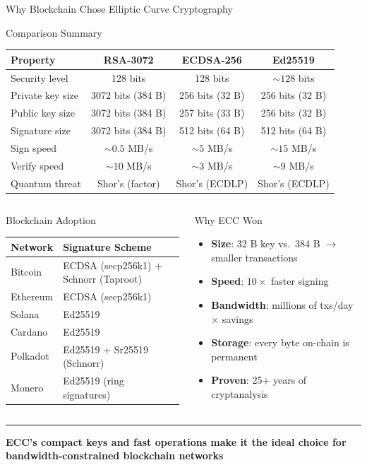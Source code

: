 \documentclass[8pt,aspectratio=169]{beamer}
\newcommand{\bottomnote}[1]{\vfill\vspace{-2mm}\textcolor{mllavender2}{\rule{\textwidth}{0.4pt}}\vspace{1mm}\footnotesize\textbf{#1}}
\begin{document}
\begin{frame}{Why Blockchain Chose Elliptic Curve Cryptography}
\begin{block}{Comparison Summary}
\small
\begin{center}
\begin{tabular}{lccc}
\toprule
\textbf{Property} & \textbf{RSA-3072} & \textbf{ECDSA-256} & \textbf{Ed25519} \\
\midrule
Security level & 128 bits & 128 bits & $\sim 128$ bits \\
Private key size & 3072 bits (384 B) & 256 bits (32 B) & 256 bits (32 B) \\
Public key size & 3072 bits (384 B) & 257 bits (33 B) & 256 bits (32 B) \\
Signature size & 3072 bits (384 B) & 512 bits (64 B) & 512 bits (64 B) \\
Sign speed & $\sim 0.5$ MB/s & $\sim 5$ MB/s & $\sim 15$ MB/s \\
Verify speed & $\sim 10$ MB/s & $\sim 3$ MB/s & $\sim 9$ MB/s \\
Quantum threat & Shor's (factor) & Shor's (ECDLP) & Shor's (ECDLP) \\
\bottomrule
\end{tabular}
\end{center}
\end{block}
\vspace{2mm}
\begin{columns}
\begin{block}{Blockchain Adoption}
\scriptsize
\begin{tabular}{ll}
\toprule
\textbf{Network} & \textbf{Signature Scheme} \\
\midrule
Bitcoin & ECDSA (secp256k1) + Schnorr (Taproot) \\
Ethereum & ECDSA (secp256k1) \\
Solana & Ed25519 \\
Cardano & Ed25519 \\
Polkadot & Ed25519 + Sr25519 (Schnorr) \\
Monero & Ed25519 (ring signatures) \\
\bottomrule
\end{tabular}
\end{block}
\begin{block}{Why ECC Won}
\begin{itemize}\small
  \item \textbf{Size}: 32 B key vs.\ 384 B $\to$ smaller transactions
  \item \textbf{Speed}: $10\times$ faster signing
  \item \textbf{Bandwidth}: millions of txs/day $\times$ savings
  \item \textbf{Storage}: every byte on-chain is permanent
  \item \textbf{Proven}: 25+ years of cryptanalysis
\end{itemize}
\end{block}
\end{columns}
\bottomnote{ECC's compact keys and fast operations make it the ideal choice for bandwidth-constrained blockchain networks}
\end{frame}
\end{document}
